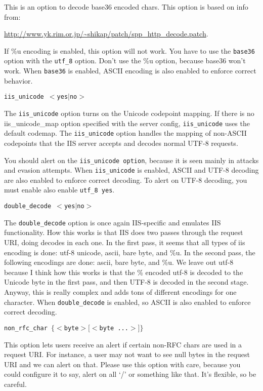 \documentclass[english]{report}
\newcounter{slistnum}
\newenvironment{slist}
{ \begin{list}{ {\bf \arabic{slistnum}.} }{\usecounter{slistnum} } }
{ \end{list} }
\begin{document}
\begin{slist}
This is an option to decode base36 encoded chars.  This option is based on
info from:

\url{http://www.yk.rim.or.jp/~shikap/patch/spp\_http\_decode.patch}.

If \%u encoding is enabled, this option will not work.  You have to use the
\texttt{base36} option with the \texttt{utf\_8} option.  Don't use the \%u
option, because base36 won't work.  When \texttt{base36} is enabled, ASCII
encoding is also enabled to enforce correct behavior.

\item \texttt{iis\_unicode $<$yes$|$no$>$}

The \texttt{iis\_unicode} option turns on the Unicode codepoint mapping.  If
there is no iis\_unicode\_map option specified with the server config,
\texttt{iis\_unicode} uses the default codemap.  The \texttt{iis\_unicode}
option handles the mapping of non-ASCII codepoints that the IIS server accepts
and decodes normal UTF-8 requests.

You should alert on the \texttt{iis\_unicode option}, because it is seen mainly
in attacks and evasion attempts.  When \texttt{iis\_unicode} is enabled, ASCII
and UTF-8 decoding are also enabled to enforce correct decoding.  To alert on
UTF-8 decoding, you must enable also enable \texttt{utf\_8 yes}. 

\item \texttt{double\_decode $<$yes$|$no$>$}

The \texttt{double\_decode} option is once again IIS-specific and emulates IIS
functionality.  How this works is that IIS does two passes through the request
URI, doing decodes in each one.  In the first pass, it seems that all types of
iis encoding is done: utf-8 unicode, ascii, bare byte, and \%u.  In the second
pass, the following encodings are done:  ascii, bare byte, and \%u.  We leave
out utf-8 because I think how this works is that the \% encoded utf-8 is
decoded to the Unicode byte in the first pass, and then UTF-8 is decoded in the
second stage.  Anyway, this is really complex and adds tons of different
encodings for one character.  When \texttt{double\_decode} is enabled, so ASCII
is also enabled to enforce correct decoding.

\item \texttt{non\_rfc\_char $\{ <$byte$> [<$byte ...$>] \}$}

This option lets users receive an alert if certain non-RFC chars are used in a
request URI.  For instance, a user may not want to see null bytes in the
request URI and we can alert on that.  Please use this option with care,
because you could configure it to say, alert on all `/' or something like that.
It's flexible, so be careful.


\end{slist}
\end{document}
